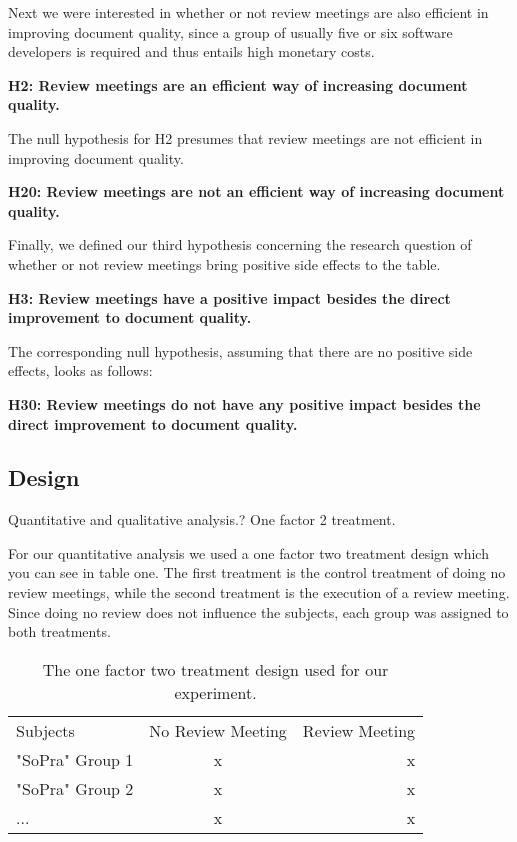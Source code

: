 Next we were interested in whether or not review meetings are also efficient in improving document quality, since a group of usually five or six software developers is required and thus entails high monetary costs.

\textbf{H2: Review meetings are an efficient way of increasing document quality.}

The null hypothesis for H2 presumes that review meetings are not efficient in improving document quality.

\textbf{H20: Review meetings are not an efficient way of increasing document quality.}

Finally, we defined our third hypothesis concerning the research question of whether or not review meetings bring positive side effects to the table.

\textbf{H3: Review meetings have a positive impact besides the direct improvement to document quality.}

The corresponding null hypothesis, assuming that there are no positive side effects, looks as follows:

\textbf{H30: Review meetings do not have any positive impact besides the direct improvement to document quality.}

\subsection{Design}

Quantitative and qualitative analysis.?
One factor 2 treatment.

For our quantitative analysis we used a one factor two treatment design which you can see in table one. The first treatment is the control treatment of doing no review meetings, while the second treatment is the execution of a review meeting. Since doing no review does not influence the subjects, each group was assigned to both treatments. 


\begin{table}
\centering
\begin{tabular}{lcr}
  \rowcolor{heading}Subjects & No Review Meeting & Review Meeting \\
  \rowcolor{a}"SoPra" Group 1 & x & x \\
  \rowcolor{b}"SoPra" Group 2 & x & x \\
  \rowcolor{a}... & x & x \\
\end{tabular}
\caption{The one factor two treatment design used for our experiment.}
\end{table}



